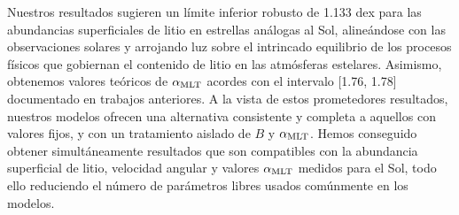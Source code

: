 Nuestros resultados sugieren un límite inferior robusto de 1.133 dex para las abundancias superficiales de litio en estrellas análogas al Sol, alineándose con las observaciones solares y arrojando luz sobre el intrincado equilibrio de los procesos físicos que gobiernan el contenido de litio en las atmósferas estelares. Asimismo, obtenemos valores teóricos de $\alpha_{\mathrm{MLT}}$ acordes con el intervalo [1.76, 1.78] documentado en trabajos anteriores. A la vista de estos prometedores resultados, nuestros modelos ofrecen una alternativa consistente y completa a aquellos con valores fijos, y con un tratamiento aislado de $B$ y $\alpha_{\mathrm{MLT}}$. Hemos conseguido obtener simultáneamente resultados que son compatibles con la abundancia superficial de litio, velocidad angular y valores $\alpha_{\mathrm{MLT}}$ medidos para el Sol, todo ello reduciendo el número de parámetros libres usados comúnmente en los modelos.\par

\endinput
